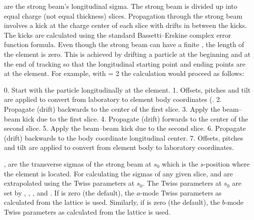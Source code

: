  are the strong beam's longitudinal sigma.  The strong beam is divided up into
 equal charge (not equal thickness) slices. Propagation through the strong beam involves
a kick at the charge center of each slice with drifts in between the kicks. The kicks are calculated
using the standard Bassetti--Erskine complex error function formula\cite{b:talman}. Even though the
strong beam can have a finite , the length of the  element is zero. This is
achieved by drifting a particle at the beginning and at the end of tracking so that the longitudinal
starting point and ending points are at the  element. For example, with  =
2 the calculation would proceed as follows:
\begin{example}
  0. Start with the particle longitudinally at the  element.
  1. Offsets, pitches and tilt are applied to convert from laboratory to element 
       body coordinates (.
  2. Propagate (drift) backwards to the center of the first slice.
  3. Apply the beam--beam kick due to the first slice.
  4. Propagate (drift) forwards to the center of the second slice.
  5. Apply the beam--beam kick due to the second slice.
  6. Propagate (drift) backwards to the body coordinate longitudinal center.
  7. Offsets, pitches and tilt are applied to convert from element body to 
       laboratory coordinates.
\end{example}

,  are the transverse sigmas of the strong beam at $s_0$ which is the
$s$-position where the  element is located.  For calculating the sigmas of any given
slice,  and  are extrapolated using the Twiss parameters at $s_0$. The Twiss
parameters at $s_0$ are set by , , , and
.  If  is zero (the default), the $a$-mode Twiss parameters as
calculated from the lattice is used. Similarly, if  is zero (the default), the
$b$-mode Twiss parameters as calculated from the lattice is used.

